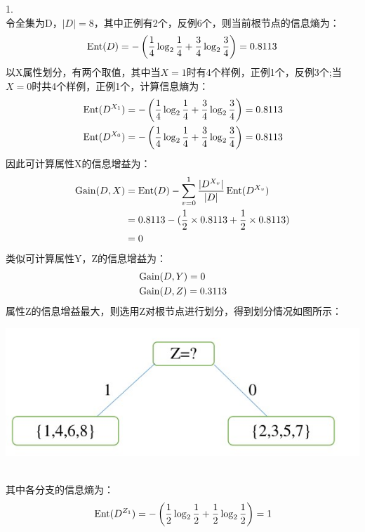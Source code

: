 \documentclass[answers]{exam}  %
\begin{document}
\begin{questions}
	\begin{solution}
		1.\\
        令全集为D，$|D|=8$，其中正例有2个，反例6个，则当前根节点的信息熵为：
        $$\operatornamewithlimits{Ent}(D)= -\left(\frac14\log_2{\frac14}+\frac34\log_2{\frac34} \right)=0.8113$$
        以X属性划分，有两个取值，其中当$X=1$时有4个样例，正例1个，反例3个;当$X=0$时共4个样例，正例1个，计算信息熵为：
        $$\begin{aligned}
            &\operatornamewithlimits{Ent}(D^{X_1}) = -\left(\frac14\log_2{\frac14}+\frac34 \log_2{\frac34} \right)=0.8113\\
            &\operatornamewithlimits{Ent}(D^{X_0}) = -\left(\frac14\log_2{\frac14}+\frac34 \log_2{\frac34} \right)=0.8113\\
        \end{aligned}$$
        因此可计算属性X的信息增益为：
        $$\begin{aligned}
        \operatornamewithlimits{Gain}(D,X)
            &=\operatornamewithlimits{Ent}(D)-\sum^1_{v=0}\frac{|D^{X_v}|}{|D|}\operatornamewithlimits{Ent}(D^{X_v})\\
            &=0.8113-(\frac12\times0.8113+\frac12\times0.8113)\\
            &=0\\
        \end{aligned}$$
        类似可计算属性Y，Z的信息增益为：
        $$\begin{aligned}
            &\operatornamewithlimits{Gain}(D,Y)=0 \\
            &\operatornamewithlimits{Gain}(D,Z)=0.3113\\
        \end{aligned}$$
        属性Z的信息增益最大，则选用Z对根节点进行划分，得到划分情况如图所示：\\
        \centerline{\includegraphics[width=0.7\linewidth]{Z.jpg}}\\
        其中各分支的信息熵为：
        $$
        \begin{aligned}
            &\operatornamewithlimits{Ent}(D^{Z_1})=-\left(\frac12\log_2{\frac12}+ \frac12\log_2{\frac12}\right)=1\\

\end{aligned}$$
\end{solution}
\end{questions}
\end{document}
